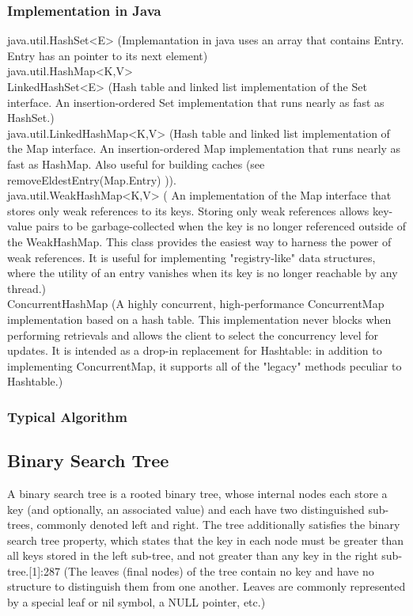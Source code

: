 \documentclass[12pt,a4paper]{article}
\newcommand{\ImplementationInJavaHead}{Implementation in Java}
\newcommand{\TypicalAlgorithmHead}{Typical Algorithm}
\begin{document}
\subsubsection{\ImplementationInJavaHead}
java.util.HashSet<E> (Implemantation in java uses an array that contains Entry. Entry has an pointer to its next element)\\
java.util.HashMap<K,V>\\
LinkedHashSet<E> (Hash table and linked list implementation of the Set interface. An insertion-ordered Set implementation that runs nearly as fast as HashSet.)\\
java.util.LinkedHashMap<K,V> (Hash table and linked list implementation of the Map interface. An insertion-ordered Map implementation that runs nearly as fast as HashMap. Also useful for building caches (see removeEldestEntry(Map.Entry) )).\\
java.util.WeakHashMap<K,V> ( An implementation of the Map interface that stores only weak references to its keys. Storing only weak references allows key-value pairs to be garbage-collected when the key is no longer referenced outside of the WeakHashMap. This class provides the easiest way to harness the power of weak references. It is useful for implementing "registry-like" data structures, where the utility of an entry vanishes when its key is no longer reachable by any thread.)\\
ConcurrentHashMap  (A highly concurrent, high-performance ConcurrentMap implementation based on a hash table. This implementation never blocks when performing retrievals and allows the client to select the concurrency level for updates. It is intended as a drop-in replacement for Hashtable: in addition to implementing ConcurrentMap, it supports all of the "legacy" methods peculiar to Hashtable.)
\subsubsection{\TypicalAlgorithmHead}

\subsection{Binary Search Tree}
A binary search tree is a rooted binary tree, whose internal nodes each store a key (and optionally, an associated value) and each have two distinguished sub-trees, commonly denoted left and right. The tree additionally satisfies the binary search tree property, which states that the key in each node must be greater than all keys stored in the left sub-tree, and not greater than any key in the right sub-tree.[1]:287 (The leaves (final nodes) of the tree contain no key and have no structure to distinguish them from one another. Leaves are commonly represented by a special leaf or nil symbol, a NULL pointer, etc.)
\end{document}
